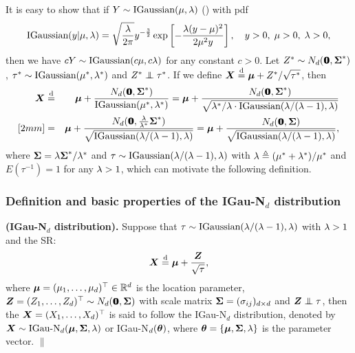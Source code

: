 It is easy to show that if $Y \sim \mbox{IGaussian}(\mu, \lambda)$ (\cite{CF1988}) with pdf
$$
    \mbox{IGaussian}(y|\mu, \lambda) = \sqrt{\frac{\lambda}{2\pi}} y^{-\frac{3}{2}} \exp\left[ -\frac{\lambda (y - \mu)^2}{2\mu^2 y} \right], \quad y > 0, \; \mu > 0, \; \lambda > 0,
$$
then we have $cY \sim \mbox{IGaussian}(c\mu, c\lambda)$ for any constant $c > 0$. Let $Z^* \sim N_d({\bf 0}\!\!\!{\bf 0}, {\mbox{\boldmath$\Sigma$}}^*)$, $\tau^* \sim \mbox{IGaussian}(\mu^*, \lambda^*)$ and $Z^* \inde \tau^*$. If we define ${\boldsymbol{X}} \stackrel{{\rm d}}{=} {\boldsymbol{\mu}} + Z^* / \sqrt{\tau^*}$, then
\begin{eqnarray*}
    \ibX &\sd& \bmu + \frac{N_d(\0, \bSi^*)}{\IGaussian(\mu^*, \la^*)} = \bmu + \frac{N_d(\0, \bSi^*)}{\sqrt{\la^* / \la \cdot \IGaussian(\la / (\la - 1), \la)}} \\ [2mm]
    &=& \bmu + \frac{N_d(\0, \frac{\la}{\la^*} \bSi^*)}{\sqrt{\IGaussian(\la / (\la - 1), \la)}} = \bmu + \frac{N_d(\0, \bSi)}{\sqrt{\IGaussian(\la / (\la - 1), \la)}},
\end{eqnarray*}
where ${\mbox{\boldmath$\Sigma$}} = \lambda {\mbox{\boldmath$\Sigma$}}^* / \lambda^*$ and $\tau \sim \mbox{IGaussian}(\lambda / (\lambda - 1), \lambda)$ with $\lambda \triangleq (\mu^* + \lambda^*) / \mu^*$ and $E(\tau^{-1}) = 1$ for any $\lambda > 1$, which can motivate the following definition.

\subsubsection{Definition and basic properties of the IGau-N$_d$ distribution}        %

\begin{definition}{\rm \textbf{(IGau-N$_d$ distribution).} Suppose that $\tau \sim \mbox{IGaussian}(\lambda / (\lambda - 1), \lambda)$ with $\lambda > 1$ and the SR:
$$
    {\boldsymbol{X}} \stackrel{{\rm d}}{=} {\boldsymbol{\mu}} + \frac{{\boldsymbol{Z}}}{\sqrt{\tau}}, 
$$
where ${\boldsymbol{\mu}} = (\mu_1, \dots, \mu_d)^\top \in {\mathbb{R}}^d$ is the location parameter, ${\boldsymbol{Z}} = (Z_1, \dots, Z_d)^\top \sim N_d({\bf 0}\!\!\!{\bf 0}, {\mbox{\boldmath$\Sigma$}})$ with scale matrix ${\mbox{\boldmath$\Sigma$}} = (\sigma_{ij})_{d\times d}$ and $\ibZ \inde \tau$, then the \trv ${\boldsymbol{X}} = (X_1, \dots, X_d)^\top$ is said to follow the IGau-N$_d$ distribution, denoted by ${\boldsymbol{X}} \sim \mbox{IGau-N}_d({\boldsymbol{\mu}}, {\mbox{\boldmath$\Sigma$}}, \lambda)$ or IGau-N$_d({\boldsymbol{\theta}})$, where ${\boldsymbol{\theta}} = \{{\boldsymbol{\mu}}, {\mbox{\boldmath$\Sigma$}}, \lambda\}$ is the parameter vector. \hfill $\|$
}\end{definition}

